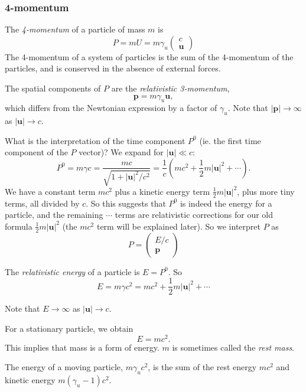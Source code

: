 \documentclass[a4paper]{article}
\begin{document}
\subsubsection*{4-momentum}
\begin{defi}[4-momentum]
  The \emph{4-momentum} of a particle of mass $m$ is
  \[
    P = mU = m\gamma_u
    \begin{pmatrix}
      c\\
      \mathbf{u}
    \end{pmatrix}
  \]
  The 4-momentum of a system of particles is the sum of the 4-momentum of the particles, and is conserved in the absence of external forces.

  The spatial components of $P$ are the \emph{relativistic 3-momentum},
  \[
    \mathbf{p} = m\gamma_u \mathbf{u},
  \]
  which differs from the Newtonian expression by a factor of $\gamma_u$. Note that $|\mathbf{p}| \to \infty$ as $|\mathbf{u}| \to c$.
\end{defi}

What is the interpretation of the time component $P^0$ (ie. the first time component of the $P$ vector)? We expand for $|\mathbf{u}| \ll c$:
\[
  P^0 = m\gamma c = \frac{mc}{\sqrt{1 + |\mathbf{u}|^2/c^2}} = \frac{1}{c}\left(mc^2 + \frac{1}{2}m|\mathbf{u}|^2 + \cdots\right).
\]
We have a constant term $mc^2$ plus a kinetic energy term $\frac{1}{2}m|\mathbf{u}|^2$, plus more tiny terms, all divided by $c$. So this suggests that $P^0$ is indeed the energy for a particle, and the remaining $\cdots$ terms are relativistic corrections for our old formula $\frac{1}{2}m|\mathbf{u}|^2$ (the $mc^2$ term will be explained later). So we interpret $P$ as
\[
  P =
  \begin{pmatrix}
    E/c\\
    \mathbf{p}
  \end{pmatrix}
\]
\begin{defi}
  The \emph{relativistic energy} of a particle is $E = P^0$. So
  \[
    E = m\gamma c^2 = mc^2 + \frac{1}{2}m|\mathbf{u}|^2 + \cdots
  \]
\end{defi}
Note that $E\to \infty$ as $|\mathbf{u}| \to c$.

For a stationary particle, we obtain
\[
  E = mc^2.
\]
This implies that mass is a form of energy. $m$ is sometimes called the \emph{rest mass}.

The energy of a moving particle, $m\gamma_u c^2$, is the sum of the rest energy $mc^2$ and kinetic energy $m(\gamma_u - 1)c^2$.
\end{document}
